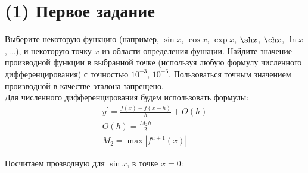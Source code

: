 \maketitle
\tableofcontents
\newpage
\section{(1) Первое задание}
Выберите некоторую функцию (например, $\sin x$, $\cos x$, $\exp x$, $\sh x$, $\ch x$, $\ln x$, \ldots), и некоторую точку $x$ из области определения функции. Найдите значение производной функции в выбранной точке (используя любую формулу численного дифференцирования) с точностью $10^{-3}$, $10^{-6}$. Пользоваться точным значением производной в качестве эталона запрещено.\\[2mm]

Для численного дифференцирования будем использовать формулы:\\
\begin{gather*}
  y^{'} = \frac{f(x) - f(x-h)}{h} + O(h)\\[1mm]
  O(h) = \frac{M_{2}h}{2} \\[1mm]
  M_{2} = \max \left|f^{n+1}(x)\right|
\end{gather*}

Посчитаем прозводную для $\sin x$, в точке $x = 0$:\\


